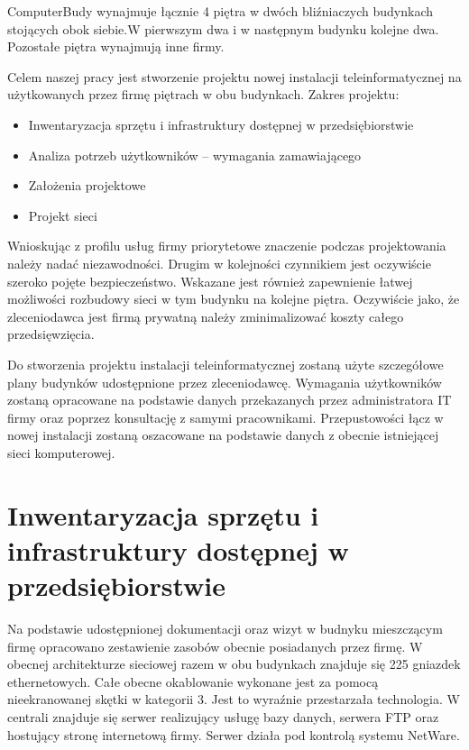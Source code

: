 \documentclass{report}
\begin{document}
ComputerBudy wynajmuje łącznie 4 piętra w dwóch bliźniaczych budynkach stojących obok siebie.W pierwszym dwa i w następnym budynku kolejne dwa.
Pozostałe piętra wynajmują inne firmy.

Celem naszej pracy jest stworzenie projektu nowej instalacji teleinformatycznej na użytkowanych przez firmę piętrach w obu budynkach. Zakres projektu:
\begin{itemize}
\item{Inwentaryzacja sprzętu i infrastruktury dostępnej w przedsiębiorstwie}
\item{Analiza potrzeb użytkowników – wymagania zamawiającego}
\item{Założenia projektowe}
\item{Projekt sieci}
 
\end{itemize}
Wnioskując z profilu usług firmy priorytetowe znaczenie podczas projektowania należy nadać niezawodności. Drugim w kolejności czynnikiem jest oczywiście
szeroko pojęte bezpieczeństwo. Wskazane jest również zapewnienie łatwej możliwości rozbudowy sieci w tym budynku na kolejne piętra.
Oczywiście jako, że zleceniodawca jest firmą prywatną należy zminimalizować koszty całego przedsięwzięcia.

Do stworzenia projektu instalacji teleinformatycznej zostaną użyte szczegółowe plany budynków udostępnione przez zleceniodawcę.
Wymagania użytkowników zostaną opracowane na podstawie danych przekazanych przez administratora IT firmy oraz poprzez konsultację
z samymi pracownikami. Przepustowości łącz w nowej instalacji zostaną oszacowane na podstawie danych z obecnie istniejącej sieci komputerowej.

\chapter{Inwentaryzacja sprzętu i infrastruktury dostępnej w przedsiębiorstwie}
Na podstawie udostępnionej dokumentacji oraz wizyt w budnyku mieszczącym firmę opracowano zestawienie zasobów obecnie posiadanych przez firmę.
W obecnej architekturze sieciowej razem w obu budynkach znajduje się 225 gniazdek ethernetowych. Całe obecne okablowanie wykonane jest 
za pomocą nieekranowanej skętki w kategorii 3. Jest to wyraźnie przestarzała technologia. W centrali znajduje się serwer realizujący usługę
bazy danych, serwera FTP oraz hostujący stronę internetową firmy. Serwer działa pod kontrolą systemu NetWare.
\end{document}
